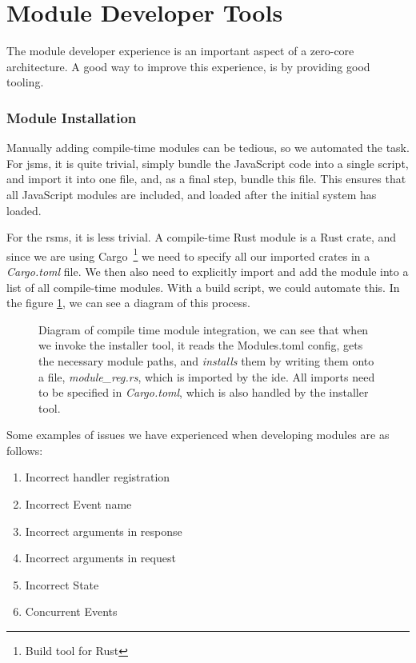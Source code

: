 \section{Module Developer Tools}

The module developer experience is an important aspect of a zero-core
architecture. A good way to improve this experience, is by providing good
tooling.

\subsubsection{Module Installation}

Manually adding compile-time modules can be tedious, so we automated the task.
For \gls{jsms}, it is quite trivial, simply bundle the JavaScript code into a
single script, and import it into one file, and, as a final step, bundle this
file. This ensures that all JavaScript modules are included, and loaded after
the initial system has loaded. 

For the \gls{rsms}, it is less trivial. A compile-time Rust module is a Rust
crate, and since we are using Cargo~\footnote{Build tool for Rust} we need to
specify all our imported crates in a \textit{Cargo.toml} file. We then also
need to explicitly import and add the module into a list of all compile-time
modules. With a build script, we could automate this. In the figure
\ref{fig:compMod}, we can see a diagram of this process. 

\begin{figure}
  \centering
  
  \caption{
    Diagram of compile time module integration, we can see that when we invoke
    the installer tool, it reads the Modules.toml config, gets the necessary
    module paths, and \textit{installs} them by writing them onto a file,
    \textit{module\_reg.rs}, which is imported by the \gls*{ide}. All imports
    need to be specified in \textit{Cargo.toml}, which is also handled by the
    installer tool.
  }
  \label{fig:compMod}
\end{figure}

Some examples of issues we have experienced when developing modules are as
follows:

\begin{enumerate}
  \item Incorrect handler registration
  \item Incorrect Event name
  \item Incorrect arguments in response
  \item Incorrect arguments in request
  \item Incorrect State
  \item Concurrent Events
\end{enumerate}

